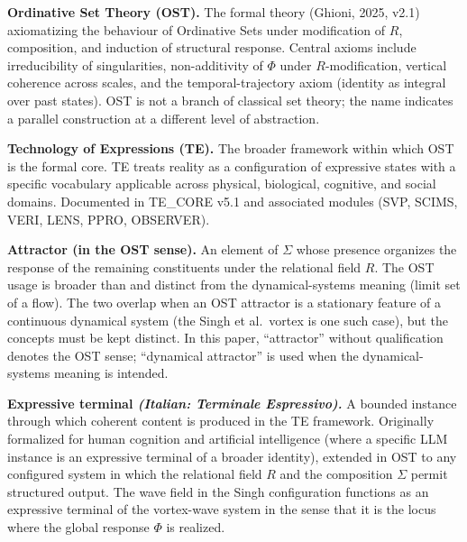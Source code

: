 \documentclass[
  11pt,
  a4paper,
]{article}
\begin{document}
\textbf{Ordinative Set Theory (OST).} The formal theory (Ghioni, 2025,
v2.1) axiomatizing the behaviour of Ordinative Sets under modification
of \(R\), composition, and induction of structural response. Central
axioms include irreducibility of singularities, non-additivity of
\(\Phi\) under \(R\)-modification, vertical coherence across scales, and
the temporal-trajectory axiom (identity as integral over past states).
OST is not a branch of classical set theory; the name indicates a
parallel construction at a different level of abstraction.

\textbf{Technology of Expressions (TE).} The broader framework within
which OST is the formal core. TE treats reality as a configuration of
expressive states with a specific vocabulary applicable across physical,
biological, cognitive, and social domains. Documented in TE\_CORE v5.1
and associated modules (SVP, SCIMS, VERI, LENS, PPRO, OBSERVER).

\textbf{Attractor (in the OST sense).} An element of \(\Sigma\) whose
presence organizes the response of the remaining constituents under the
relational field \(R\). The OST usage is broader than and distinct from
the dynamical-systems meaning (limit set of a flow). The two overlap
when an OST attractor is a stationary feature of a continuous dynamical
system (the Singh et al.~vortex is one such case), but the concepts must
be kept distinct. In this paper, ``attractor'' without qualification
denotes the OST sense; ``dynamical attractor'' is used when the
dynamical-systems meaning is intended.

\textbf{Expressive terminal \emph{(Italian: Terminale Espressivo).}} A
bounded instance through which coherent content is produced in the TE
framework. Originally formalized for human cognition and artificial
intelligence (where a specific LLM instance is an expressive terminal of
a broader identity), extended in OST to any configured system in which
the relational field \(R\) and the composition \(\Sigma\) permit
structured output. The wave field in the Singh configuration functions
as an expressive terminal of the vortex-wave system in the sense that it
is the locus where the global response \(\Phi\) is realized.
\end{document}
